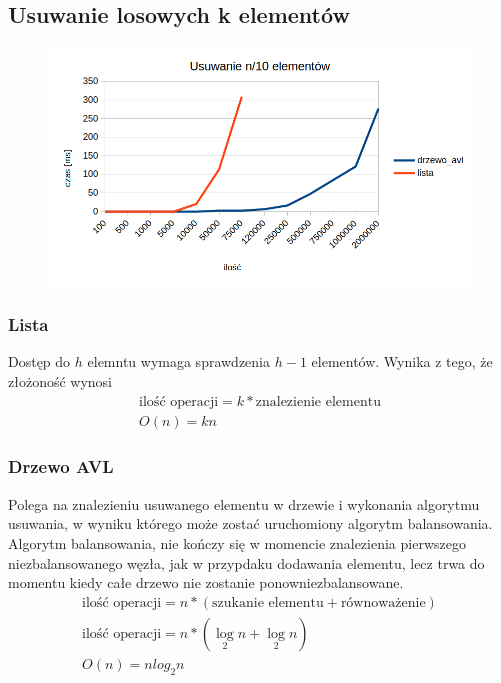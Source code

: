 \documentclass[]{article}
\begin{document}
		\subsection{Usuwanie losowych k elementów}
			\begin{figure}[H]
				\includegraphics{remove.png}
			\end{figure}
			\subsubsection{Lista}
				Dostęp do $h$ elemntu wymaga sprawdzenia $h-1$ elementów. Wynika z tego, że złożoność wynosi
				\begin{equation}
					\begin{gathered}
						\text{ilość operacji} = k * \text{znalezienie elementu} \\
						
						O(n) = kn
					\end{gathered}
				\end{equation}

			\subsubsection{Drzewo AVL}
				Polega na znalezieniu usuwanego elementu w drzewie i wykonania algorytmu usuwania, w wyniku którego może zostać uruchomiony algorytm balansowania. Algorytm balansowania, nie kończy się w momencie znalezienia pierwszego niezbalansowanego węzła, jak w przypdaku dodawania elementu, lecz trwa do momentu kiedy całe drzewo nie zostanie ponowniezbalansowane.
				\begin{equation}
					\begin{gathered}
					\text{ilość operacji} = n * (\text{szukanie elementu} + \text{równoważenie}) \\
					
					\text{ilość operacji} = n * (\log\limits_{2}{n} + \log\limits_{2}{n}) \\
					
					O(n) = nlog_2{n}
					\end{gathered}
				\end{equation}
\end{document}
